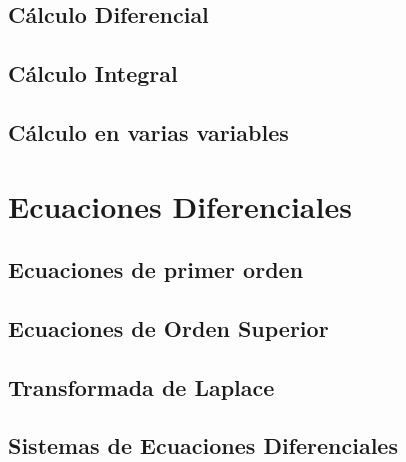 \documentclass[
]{tufte-book}
\begin{document}
\chapter{Cálculo Diferencial}








\chapter{Cálculo Integral}
	








\chapter{Cálculo en varias variables}



\part{Ecuaciones Diferenciales}

\chapter{Ecuaciones de primer orden}





\chapter{Ecuaciones de Orden Superior}








\chapter{Transformada de Laplace}






\chapter{Sistemas de Ecuaciones Diferenciales}




%
{}

\end{document}

